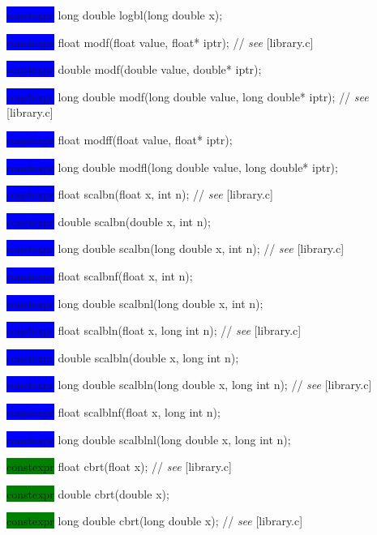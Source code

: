 \documentclass[prd,twocolumn,amsmath,amssymb,nofootinbib,eqsecnum]{revtex4-1}
\newcommand{\highlight}[1]{\colorbox{green}{\!\!\!\! #1}}
\newcommand{\oldhighlight}[1]{\colorbox{blue}{\!\!\!\! #1}}
\newcommand{\stdcomment}[1]{{// {\it see} [#1]}}
\begin{document}
{\oldhighlight{constexpr} long double logbl(long double x);

\vspace{2ex}


\oldhighlight{constexpr}  float modf(float value, float* iptr); \stdcomment{library.c}

\oldhighlight{constexpr}  double modf(double value, double* iptr);

\oldhighlight{constexpr}  long double modf(long double value, long double* iptr); \stdcomment{library.c}

\oldhighlight{constexpr}  float modff(float value, float* iptr);

\oldhighlight{constexpr}  long double modfl(long double value, long double* iptr);

\vspace{2ex}


\oldhighlight{constexpr} float scalbn(float x, int n); \stdcomment{library.c}

\oldhighlight{constexpr} double scalbn(double x, int n);

\oldhighlight{constexpr} long double scalbn(long double x, int n); \stdcomment{library.c}

\oldhighlight{constexpr} float scalbnf(float x, int n);

\oldhighlight{constexpr} long double scalbnl(long double x, int n);

\vspace{2ex}


\oldhighlight{constexpr} float scalbln(float x, long int n); \stdcomment{library.c}

\oldhighlight{constexpr} double scalbln(double x, long int n);

\oldhighlight{constexpr} long double scalbln(long double x, long int n); \stdcomment{library.c}

\oldhighlight{constexpr} float scalblnf(float x, long int n);

\oldhighlight{constexpr} long double scalblnl(long double x, long int n);

\vspace{2ex}

\highlight{constexpr} float cbrt(float x); \stdcomment{library.c}

\highlight{constexpr} double cbrt(double x);

\highlight{constexpr} long double cbrt(long double x); \stdcomment{library.c}

}
\end{document}
